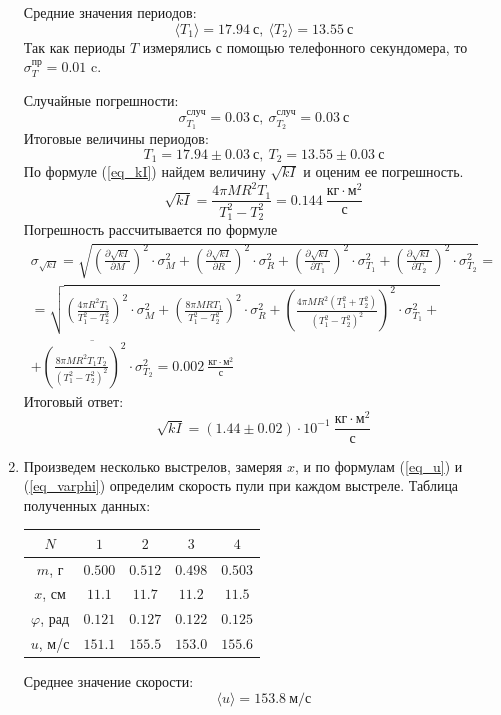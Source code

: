 \documentclass[a4paper,12pt]{article}
\begin{document}
\begin{enumerate}
    Средние значения периодов:
    $$
    \langle T_1 \rangle = 17.94~\text{с},~\langle T_2 \rangle = 13.55~\text{с}
    $$
    Так как периоды $T$ измерялись с помощью телефонного секундомера, то $\sigma^{\text{пр}}_T = 0.01$ c. 
    
    Случайные погрешности:
    $$
    \sigma^{\text{случ}}_{T_1} = 0.03~\text{с},~\sigma^{\text{случ}}_{T_2} = 0.03~\text{с}
    $$ 
    Итоговые величины периодов:
    $$
    T_1 = 17.94 \pm 0.03~\text{с},~ T_2 = 13.55 \pm 0.03~\text{с}
    $$
    По формуле (\ref{eq_kI}) найдем величину $\sqrt{kI}$ и оценим ее погрешность.
    $$
    \sqrt{kI} = \frac{4\pi MR^2T_1}{T_1^2 - T_2^2} = 0.144~\frac{\text{кг}\cdot\text{м}^2}{\text{с}}
    $$
    Погрешность рассчитывается по формуле
    \begin{multline*}
        \sigma_{\sqrt{kI}} = \sqrt{\left(\frac{\partial{\sqrt{kI}}}{\partial{M}}\right)^2\cdot\sigma_M^2 + \left(\frac{\partial{\sqrt{kI}}}{\partial{R}}\right)^2\cdot \sigma_R^2 + \left(\frac{\partial{\sqrt{kI}}}{\partial{T_1}}\right)^2\cdot \sigma_{T_1}^2 + \left(\frac{\partial{\sqrt{kI}}}{\partial{T_2}}\right)^2\cdot \sigma_{T_2}^2} = \\
        = \sqrt{\left(\frac{4\pi R^2 T_1}{T_1^2 - T_2^2}\right)^2 \cdot \sigma_M^2 + \left(\frac{8\pi MRT_1}{T_1^2 - T_2^2}\right)^2\cdot \sigma_R^2 + \left(\frac{4\pi MR^2\left(T_1^2 + T_2^2\right)}{\left(T_1^2-T_2^2\right)^2}\right)^2\cdot \sigma_{T_1}^2 +} \\ 
        \overline{+ \left(\frac{8\pi MR^2T_1T_2}{\left(T_1^2-T_2^2\right)^2}\right)^2\cdot \sigma_{T_2}^2} = 0.002~\frac{\text{кг}\cdot\text{м}^2}{\text{с}}
    \end{multline*}
    Итоговый ответ:
    $$
    \sqrt{kI} = (1.44 \pm 0.02) \cdot 10^{-1}~\frac{\text{кг}\cdot\text{м}^2}{\text{с}}
    $$

    \item Произведем несколько выстрелов, замеряя $x$, и по формулам (\ref{eq_u}) и (\ref{eq_varphi}) определим скорость пули при каждом выстреле. Таблица полученных данных: 
    \begin{table}[h]
        \centering
        \begin{tabular}{|c|c|c|c|c|}
            \hline 
            $N$ & $1$ & $2$ & $3$ & $4$ \\ \hline 
            $m$, г & $0.500$ & $0.512$ & $0.498$ & $0.503$ \\ \hline 
            $x$, см & $11.1$ & $11.7$ & $11.2$ & $11.5$ \\ \hline
            $\varphi$, рад & $0.121$ & $0.127$ & $0.122$ & $0.125$ \\ \hline
            $u$, м/с & $151.1$ & $155.5$ & $153.0$ & $155.6$ \\ \hline
        \end{tabular} 
    \end{table}
    Среднее значение скорости:
    $$
    \langle u \rangle = 153.8~\text{м/с}
    $$


\end{enumerate}
\end{document}
